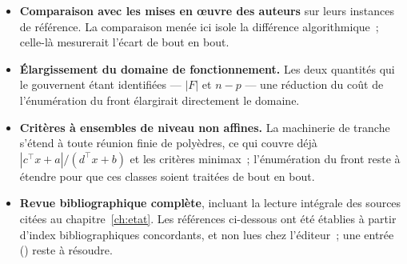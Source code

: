 \documentclass[12pt,a4paper]{report}
\theoremstyle{plain}
\theoremstyle{definition}
\begin{document}
\begin{itemize}[itemsep=3pt]
\item \textbf{Comparaison avec les mises en {\oe}uvre des auteurs} sur leurs
      instances de référence.  La comparaison menée ici isole la différence
      algorithmique~; celle-là mesurerait l'écart de bout en bout.
\item \textbf{Élargissement du domaine de fonctionnement.}  Les deux quantités
      qui le gouvernent étant identifiées --- $|F|$ et $n-p$ --- une réduction
      du coût de l'énumération du front élargirait directement le domaine.
\item \textbf{Critères à ensembles de niveau non affines.}  La machinerie de
      tranche s'étend à toute réunion finie de polyèdres, ce qui couvre déjà
      $|c^{\top}x+a|/(d^{\top}x+b)$ et les critères minimax~; l'énumération du
      front reste à étendre pour que ces classes soient traitées de bout en
      bout.
\item \textbf{Revue bibliographique complète}, incluant la lecture intégrale
      des sources citées au chapitre~\ref{ch:etat}.  Les références
      ci-dessous ont été établies à partir d'index bibliographiques
      concordants, et non lues chez l'éditeur~; une entrée
      (\cite{younsiabbaci2025}) reste à résoudre.
\end{itemize}



\end{document}
